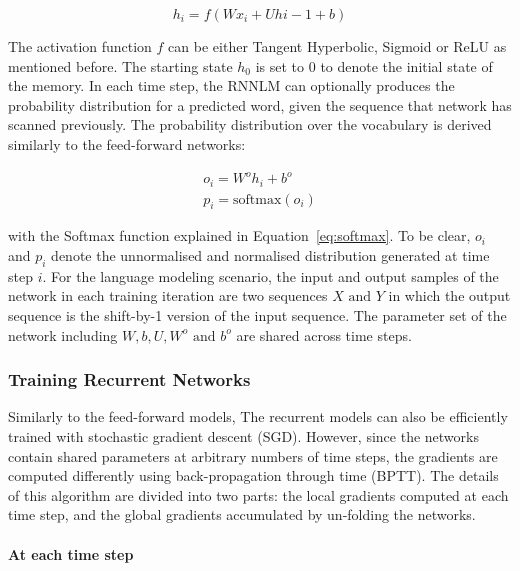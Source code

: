 \begin{equation}
h_i = f(Wx_i +  Uh{i-1} + b)
\end{equation}

The activation function $f$ can be either Tangent Hyperbolic, Sigmoid or ReLU as mentioned before. The starting state $h_0$ is set to 0 to denote the initial state of the memory. In each time step, the RNNLM can optionally produces the probability distribution for a predicted word, given the sequence that network has scanned previously. The probability distribution over the vocabulary is derived similarly to the feed-forward networks:

\begin{equation}
\begin{aligned}
o_i = W^oh_i + b^o \\
p_i = \text{softmax}(o_i)
\end{aligned}
\end{equation}

with the Softmax function explained in Equation~\ref{eq:softmax}. To be clear, $o_i$ and $p_i$ denote the unnormalised and normalised distribution generated at time step $i$. For the language modeling scenario, the input and output samples of the network in each training iteration are two sequences $X \text{ and } Y$ in which the output sequence is the shift-by-1 version of the input sequence. The parameter set of the network including $W, b, U, W^o \text{ and } b^o$ are shared across time steps. 


\subsubsection{Training Recurrent Networks}

Similarly to the feed-forward models, The recurrent models can also be efficiently trained with stochastic gradient descent (SGD). However, since the networks contain shared parameters at arbitrary numbers of time steps, the gradients are computed differently using back-propagation through time (BPTT). The details of this algorithm are divided into two parts: the local gradients computed  at each time step, and the global gradients accumulated by un-folding the networks. 

\paragraph{At each time step}


